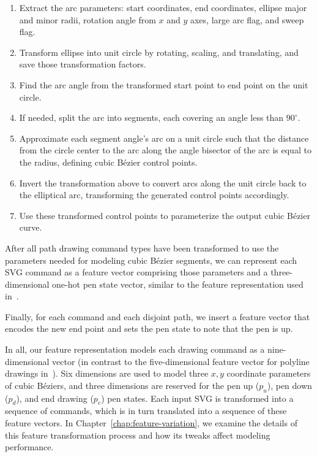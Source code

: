 \begin{enumerate}
    \item Extract the arc parameters: start coordinates, end coordinates, ellipse major and minor radii, rotation angle from $x$ and $y$ axes, large arc flag, and sweep flag. 
    \item Transform ellipse into unit circle by rotating, scaling, and translating, and save those transformation factors.
    \item Find the arc angle from the transformed start point to end point on the unit circle.
    \item If needed, split the arc into segments, each covering an angle less than $90^\circ$.
    \item Approximate each segment angle's arc on a unit circle such that the distance from the circle center to the arc along the angle bisector of the arc is equal to the radius, defining cubic B\'ezier control points.
	\item Invert the transformation above to convert arcs along the unit circle back to the elliptical arc, transforming the generated control points accordingly.
	\item Use these transformed control points to parameterize the output cubic B\'ezier curve.
\end{enumerate}

After all path drawing command types have been transformed to use the parameters needed for modeling cubic B\'ezier segments, we can represent each SVG command as a feature vector comprising those parameters and a three-dimensional one-hot pen state vector, similar to the feature representation used in~\cite{ha2017neural}.

Finally, for each  command and each disjoint path, we insert a feature vector that encodes the new end point and sets the pen state to note that the pen is up.

In all, our feature representation models each drawing command as a nine-dimensional vector (in contrast to the five-dimensional feature vector for polyline drawings in~\cite{ha2017neural}).
Six dimensions are used to model three $x, y$ coordinate parameters of cubic B\'eziers, and three dimensions are reserved for the pen up ($p_u$), pen down ($p_d$), and end drawing ($p_e$) pen states.
Each input SVG is transformed into a sequence of commands, which is in turn translated into a sequence of these feature vectors.
In Chapter~\ref{chap:feature-variation}, we examine the details of this feature transformation process and how its tweaks affect modeling performance.
